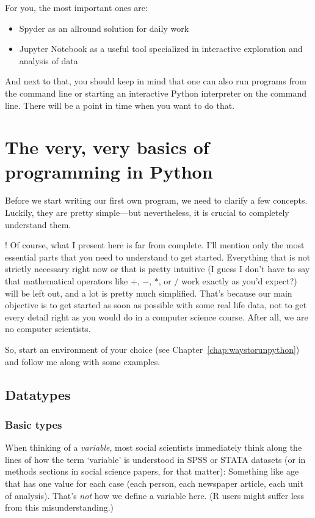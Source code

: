 \documentclass[a4paper,12pt]{book}
\let\oldquote\quote
\let\endoldquote\endquote
\renewenvironment{quote}{
\oldquote\footnotesize
\lettrine[lines=3]{\color{BrickRed}!}{ }}
{\endoldquote}
\begin{document}
For you, the most important ones are:

\begin{itemize}
	\item Spyder as an allround solution for daily work
	\item Jupyter Notebook as a useful tool specialized in interactive exploration and analysis of data
\end{itemize}
 
And next to that, you should keep in mind that one can also run programs from the command line or starting an interactive Python interpreter on the command line. There will be a point in time when you want to do that.

 
 
 
\chapter{The very, very basics of programming in Python}
\label{chap:basics}
Before we start writing our first own program, we need to clarify a few concepts. Luckily, they are pretty simple---but nevertheless, it is crucial to completely understand them. 

\begin{quote}
Of course, what I present here is far from complete. I'll mention only the most essential parts that you need to understand to get started. Everything that is not strictly necessary right now or that is pretty intuitive (I guess I don't have to say that mathematical operators like $+$, $-$, $*$, or $/$ work exactly as you'd expect?) will be left out, and a lot is pretty much simplified. That's because our main objective is to get started as soon as possible with some real life data, not to get every detail right as you would do in a computer science course. After all, we are no computer scientists.  
\end{quote}

So, start an environment of your choice (see Chapter~\ref{chap:waystorunpython}) and follow me along with some examples.


\section{Datatypes}
\label{datatypes}
\subsection{Basic types}
When thinking of a \emph{variable}, most social scientists immediately think along the lines of how the term `variable' is understood in SPSS or STATA datasets (or in methods sections in social science papers, for that matter): Something like age that has one value for each case (each person, each newspaper article, each unit of analysis). That's \emph{not} how we define a variable here. (R users might suffer less from this misunderstanding.)
\end{document}
